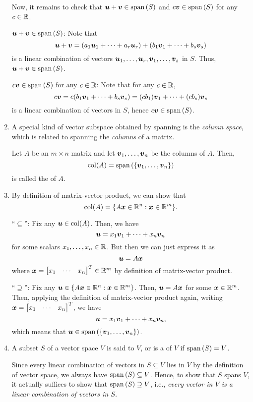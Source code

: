\begin{enumerate}
\begin{pf}
Now, it remains to check that \(\vb*{u}+\vb*{v}\in\operatorname{span}\qty(S)\) and
\(c\vb*{v}\in\operatorname{span}\qty(S)\) for any \(c\in\mathbb{R}\).

\underline{\(\vb*{u}+\vb*{v}\in\operatorname{span}\qty(S)\)}: Note that
\[
\vb*{u}+\vb*{v}
=(a_1\vb*{u}_1+\dotsb+a_r\vb*{u}_r)+(b_1\vb*{v}_1+\dotsb+b_s\vb*{v}_s)
\]
is a linear combination of vectors
\(\vb*{u}_1,\dotsc,\vb*{u}_r,\vb*{v}_1,\dotsc,\vb*{v}_s\) in \(S\). Thus,
\(\vb*{u}+\vb*{v}\in\operatorname{span}\qty(S)\).

\underline{\(c\vb*{v}\in\operatorname{span}\qty(S)\) for any \(c\in\mathbb{R}\)}: Note that for any
\(c\in\mathbb{R}\),
\[
c\vb*{v}=c(b_1\vb*{v}_1+\dotsb+b_s\vb*{v}_s)
=(cb_1)\vb*{v}_1+\dotsb+(cb_s)\vb*{v}_s
\]
is a linear combination of vectors in \(S\), hence \(c\vb*{v}\in\operatorname{span}\qty(S)\).
\end{pf}
\item A special kind of vector subspace obtained by spanning is the
\emph{column space}, which is related to spanning the \emph{columns} of a
matrix.

Let \(A\) be an \(m\times n\) matrix and let \(\vb*{v}_1,\dotsc,\vb*{v}_n\)
be the columns of \(A\). Then,
\[
\operatorname{col}(A)=\operatorname{span}\qty(\{\vb*{v}_1,\dotsc,\vb*{v}_n\})
\]
is called the  of \(A\). 

\item\label{it:col-space-expr} By definition of matrix-vector product, we can
show that
\[
\operatorname{col}(A)=\{A\vb*{x}\in\mathbb{R}^n:\vb*{x}\in\mathbb{R}^m\}.
\]
\begin{pf}
``\(\subseteq\)'': Fix any \(\vb*{u}\in\operatorname{col}(A)\). Then, we have
\[
\vb*{u}=x_1\vb*{v}_1+\dotsb+x_n\vb*{v}_n
\]
for some scalars \(x_1,\dotsc,x_n\in\mathbb{R}\). But then we can just express it as
\[
\vb*{u}=A\vb*{x}
\]
where \(\vect{x}=\mqty[x_1&\cdots& x_n]^{T}\in\R^m\) by definition of matrix-vector product.

``\(\supseteq\)'': Fix any \(\vb*{u}\in\{A\vb*{x}\in\mathbb{R}^n:\vb*{x}\in\mathbb{R}^m\}\).
Then, \(\vb*{u}=A\vb*{x}\) for some \(\vb*{x}\in\mathbb{R}^m\). Then, applying the
definition of matrix-vector product again, writing
\(\vect{x}=\mqty[x_1&\cdots &x_n]^{T}\), we have
\[
\vb*{u}=x_1\vb*{v}_1+\dotsb+x_n\vb*{v}_n,
\]
which means that \(\vb*{u}\in\operatorname{span}\qty(\{\vb*{v}_1,\dotsc,\vb*{v}_n\})\).
\end{pf}
\item A subset \(S\) of a vector space \(V\) is said to  \(V\), or
is a  of \(V\) if \(\operatorname{span}\qty(S)=V\).

Since every linear combination of vectors in \(S\subseteq V\) lies in \(V\) by
the definition of vector space, we always have \(\operatorname{span}\qty(S)\subseteq V\). Hence,
to show that \(S\) spans \(V\), it actually suffices to show that
\(\operatorname{span}\qty(S)\supseteq V\), i.e., \emph{every vector in \(V\) is a linear
combination of vectors in \(S\).}


\end{enumerate}
